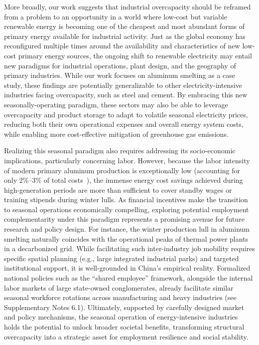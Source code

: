 \documentclass[preprint]{elsarticle}
\begin{document}
More broadly, our work suggests that industrial overcapacity should be reframed from a problem to an opportunity in a world where low-cost but variable renewable energy is becoming one of the cheapest and most abundant forms of primary energy available for industrial activity. Just as the global economy has reconfigured multiple times around the availability and characteristics of new low-cost primary energy sources, the ongoing shift to renewable electricity may entail new paradigms for industrial operations, plant design, and the geography of primary industries. While our work focuses on aluminum smelting as a case study, these findings are potentially generalizable to other electricity-intensive industries facing overcapacity, such as steel and cement. By embracing this new seasonally-operating paradigm, these sectors may also be able to leverage overcapacity and product storage to adapt to volatile seasonal electricity prices, reducing both their own operational expenses and overall energy system costs, while enabling more cost-effective mitigation of greenhouse gas emissions.

Realizing this seasonal paradigm also requires addressing its socio-economic implications, particularly concerning labor. However, because the labor intensity of modern primary aluminum production is exceptionally low (accounting for only 2\%--3\% of total costs~\citep{smm_costs_2024}), the immense energy cost savings achieved during high-generation periods are more than sufficient to cover standby wages or training stipends during winter lulls. As financial incentives make the transition to seasonal operations economically compelling, exploring potential employment complementarity under this paradigm represents a promising avenue for future research and policy design. For instance, the winter production lull in aluminum smelting naturally coincides with the operational peaks of thermal power plants in a decarbonized grid. While facilitating such inter-industry job mobility requires specific spatial planning (e.g., large integrated industrial parks) and targeted institutional support, it is well-grounded in China's empirical reality. Formalized national policies such as the ``shared employee'' framework, alongside the internal labor markets of large state-owned conglomerates, already facilitate similar seasonal workforce rotations across manufacturing and heavy industries (see Supplementary Notes 6.1). Ultimately, supported by carefully designed market and policy mechanisms, the seasonal operation of energy-intensive industries holds the potential to unlock broader societal benefits, transforming structural overcapacity into a strategic asset for employment resilience and social stability.
\end{document}
